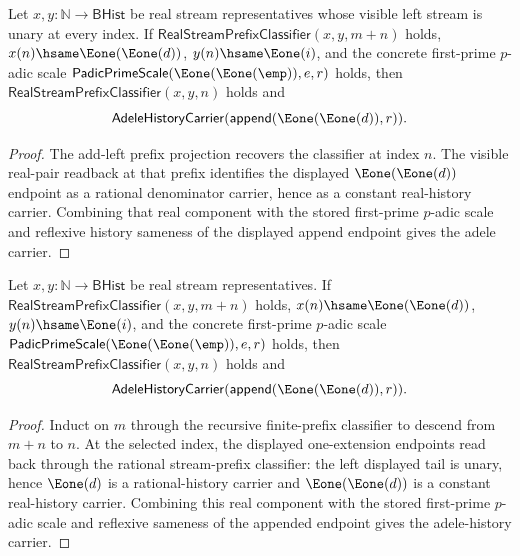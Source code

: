 \begin{theorem}
\label{thm:adele-real-stream-prefix-visible-scale-carrier}
Let $x,y:\mathbb{N}\to\mathsf{BHist}$ be real stream representatives whose visible
left stream is unary at every index. If
$\mathsf{RealStreamPrefixClassifier}(x,y,m+n)$ holds, $x(n)\hsame
\Eone(\Eone(d))$, $y(n)\hsame\Eone(i)$, and the concrete first-prime
$p$-adic scale $\mathsf{PadicPrimeScale}(\Eone(\Eone(\emp)),e,r)$ holds,
then $\mathsf{RealStreamPrefixClassifier}(x,y,n)$ holds and
$$
\mathsf{AdeleHistoryCarrier}(\mathsf{append}(\Eone(\Eone(d)),r)).
$$
\end{theorem}
\begin{proof}
The add-left prefix projection recovers the classifier at index $n$. The
visible real-pair readback at that prefix identifies the displayed
$\Eone(\Eone(d))$ endpoint as a rational denominator carrier, hence as a
constant real-history carrier. Combining that real component with the stored
first-prime $p$-adic scale and reflexive history sameness of the displayed
append endpoint gives the adele carrier.
\end{proof}

\begin{theorem}
\label{thm:adele-real-stream-prefix-long-prefix-visible-scale-carrier}
Let $x,y:\mathbb{N}\to\mathsf{BHist}$ be real stream representatives. If
$\mathsf{RealStreamPrefixClassifier}(x,y,m+n)$ holds, $x(n)\hsame
\Eone(\Eone(d))$, $y(n)\hsame\Eone(i)$, and the concrete first-prime
$p$-adic scale $\mathsf{PadicPrimeScale}(\Eone(\Eone(\emp)),e,r)$ holds,
then $\mathsf{RealStreamPrefixClassifier}(x,y,n)$ holds and
$$
\mathsf{AdeleHistoryCarrier}(\mathsf{append}(\Eone(\Eone(d)),r)).
$$
\end{theorem}
\begin{proof}
Induct on $m$ through the recursive finite-prefix classifier to descend from
$m+n$ to $n$. At the selected index, the displayed one-extension endpoints
read back through the rational stream-prefix classifier: the left displayed
tail is unary, hence $\Eone(d)$ is a rational-history carrier and
$\Eone(\Eone(d))$ is a constant real-history carrier. Combining this real
component with the stored first-prime $p$-adic scale and reflexive sameness of
the appended endpoint gives the adele-history carrier.
\end{proof}

